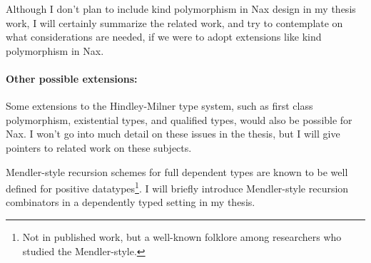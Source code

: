 Although I don't plan to include kind polymorphism in Nax design in
my thesis work, I will certainly summarize the related work, and try to
contemplate on what considerations are needed, if we were to adopt
extensions like kind polymorphism in Nax.

\paragraph{Other possible extensions:}

Some extensions to the Hindley-Milner type system, such as
first class polymorphism, existential types, and qualified types,
would also be possible for Nax. I won't go into much detail on these issues
in the thesis, but I will give pointers to related work on these subjects.

Mendler-style recursion schemes for full dependent types are known to be well
defined for positive datatypes\footnote{Not in published work, but a well-known
folklore among researchers who studied the Mendler-style.}. I will briefly
introduce Mendler-style recursion combinators in a dependently typed setting
in my thesis.

